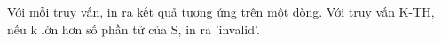 Với mỗi truy vấn, in ra kết quả tương ứng trên một dòng. Với truy vấn K-TH, nếu k lớn hơn số phần tử của S, in ra 'invalid'.
